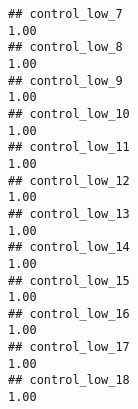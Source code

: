 \documentclass[
]{article}
\begin{document}
\begin{verbatim}
## control_low_7                                                                                                                                                                                                               1.00
## control_low_8                                                                                                                                                                                                               1.00
## control_low_9                                                                                                                                                                                                               1.00
## control_low_10                                                                                                                                                                                                              1.00
## control_low_11                                                                                                                                                                                                              1.00
## control_low_12                                                                                                                                                                                                              1.00
## control_low_13                                                                                                                                                                                                              1.00
## control_low_14                                                                                                                                                                                                              1.00
## control_low_15                                                                                                                                                                                                              1.00
## control_low_16                                                                                                                                                                                                              1.00
## control_low_17                                                                                                                                                                                                              1.00
## control_low_18                                                                                                                                                                                                              1.00

\end{verbatim}
\end{document}
